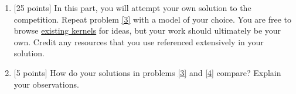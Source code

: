 \documentclass[12pt]{article}
\newenvironment{problem}[2][Problem:]{\begin{trivlist}
\item[\hskip \labelsep {\bfseries #1}\hskip \labelsep {\bfseries #2.}]}{\end{trivlist}}
\begin{document}
\begin{problem}{Porto Seguro Dataset [65 points]}
\begin{enumerate}
    \item {[25 points]} \label{4}
    In this part, you will attempt your own solution to the competition. 
    Repeat problem \ref{3} with a model of your choice.
    You are free to browse \href{https://www.kaggle.com/c/porto-seguro-safe-driver-prediction/kernels}{existing kernels} for ideas, but your work should ultimately be your own. 
    Credit any resources that you use referenced extensively in your solution.
    
    \item {[5 points]}
    How do your solutions in problems \ref{3} and \ref{4} compare? Explain your observations. 



\end{enumerate}
\end{problem}
\end{document}
